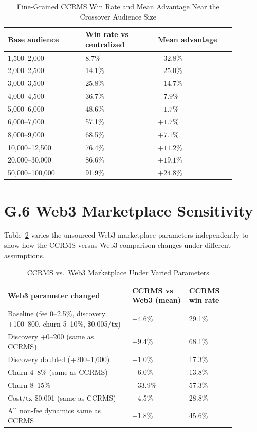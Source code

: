 \begin{table}[h]
\centering
\caption{Fine-Grained CCRMS Win Rate and Mean Advantage Near the Crossover Audience Size}\label{tab:crossover-fine}
\begin{tabular}{@{}p{0.30\linewidth} p{0.28\linewidth} p{0.30\linewidth}@{}}
\toprule
\textbf{Base audience} & \textbf{Win rate vs centralized} & \textbf{Mean advantage} \\
\midrule
1,500--2,000    & 8.7\%  & $-32.8\%$ \\
2,000--2,500    & 14.1\% & $-25.0\%$ \\
3,000--3,500    & 25.8\% & $-14.7\%$ \\
4,000--4,500    & 36.7\% & $-7.9\%$ \\
5,000--6,000    & 48.6\% & $-1.7\%$ \\
6,000--7,000    & 57.1\% & $+1.7\%$ \\
8,000--9,000    & 68.5\% & $+7.1\%$ \\
10,000--12,500  & 76.4\% & $+11.2\%$ \\
20,000--30,000  & 86.6\% & $+19.1\%$ \\
50,000--100,000 & 91.9\% & $+24.8\%$ \\
\bottomrule
\end{tabular}
\end{table}

\section*{G.6 Web3 Marketplace Sensitivity}

Table~\ref{tab:web3-sensitivity} varies the unsourced Web3 marketplace parameters independently to show how the CCRMS-versus-Web3 comparison changes under different assumptions.

\begin{table}[h]
\centering
\caption{CCRMS vs.\ Web3 Marketplace Under Varied Parameters}\label{tab:web3-sensitivity}
\begin{tabular}{@{}p{0.48\linewidth} p{0.22\linewidth} p{0.18\linewidth}@{}}
\toprule
\textbf{Web3 parameter changed} & \textbf{CCRMS vs Web3 (mean)} & \textbf{CCRMS win rate} \\
\midrule
Baseline (fee 0--2.5\%, discovery +100--800, churn 5--10\%, \$0.005/tx) & +4.6\% & 29.1\% \\
Discovery +0--200 (same as CCRMS) & +9.4\% & 68.1\% \\
Discovery doubled (+200--1,600) & $-$1.0\% & 17.3\% \\
Churn 4--8\% (same as CCRMS) & $-$6.0\% & 13.8\% \\
Churn 8--15\% & +33.9\% & 57.3\% \\
Cost/tx \$0.001 (same as CCRMS) & +4.5\% & 28.8\% \\
All non-fee dynamics same as CCRMS & $-$1.8\% & 45.6\% \\
\bottomrule
\end{tabular}
\end{table}

